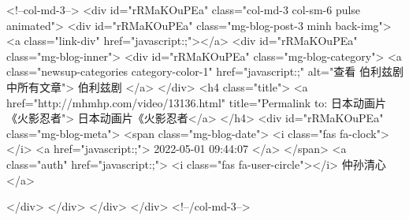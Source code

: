                         <!--col-md-3-->
                        <div id="rRMaKOuPEa"  class="col-md-3 col-sm-6 pulse animated">
                            <div id="rRMaKOuPEa"  class="mg-blog-post-3 minh back-img">
                                <a class="link-div" href="javascript:;"></a>
                                <div id="rRMaKOuPEa"  class="mg-blog-inner">
                                    <div id="rRMaKOuPEa"  class="mg-blog-category">
                                        <a class="newsup-categories category-color-1" href="javascript:;" alt="查看 伯利兹剧 中所有文章">
                                            伯利兹剧
                                        </a>
                                    </div>
                                    <h4 class="title"> <a href="http://mhmhp.com/video/13136.html" title="Permalink to: 日本动画片《火影忍者"> 日本动画片《火影忍者</a> </h4>
                                    <div id="rRMaKOuPEa"  class="mg-blog-meta">
                                        <span class="mg-blog-date">
                                            <i class="fas fa-clock"></i>
                                            <a href="javascript:;">
                                                2022-05-01 09:44:07
                                            </a>
                                        </span>
                                        <a class="auth" href="javascript:;">
                                            <i class="fas fa-user-circle"></i>
                                            仲孙清心
                                        </a>

                                    </div>
                                </div>
                            </div>
                        </div>
                        <!--/col-md-3-->
                        
